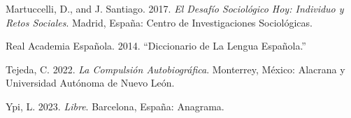 \documentclass[
]{interact}
\newlength{\cslhangindent}
\newenvironment{CSLReferences}[2] %
 {\begin{list}{}{%
  \setlength{\itemindent}{0pt}
  \setlength{\leftmargin}{0pt}
  \setlength{\parsep}{0pt}
  \ifodd #1
   \setlength{\leftmargin}{\cslhangindent}
   \setlength{\itemindent}{-1\cslhangindent}
  \fi
  \setlength{\itemsep}{#2\baselineskip}}}
 {\end{list}}
\begin{document}
\begin{CSLReferences}{1}{0}
Martuccelli, D., and J. Santiago. 2017. \emph{El Desaf{í}o Sociol{ó}gico
Hoy: Individuo y Retos Sociales}. Madrid, Espa{ñ}a: Centro de
Investigaciones Sociol{ó}gicas.

Real Academia Española. 2014. {``Diccionario de La Lengua Espa{ñ}ola.''}

Tejeda, C. 2022. \emph{La Compulsi{ó}n Autobiogr{á}fica}. Monterrey,
M{é}xico: Alacrana y Universidad Aut{ó}noma de Nuevo Le{ó}n.

Ypi, L. 2023. \emph{Libre}. Barcelona, Espa{ñ}a: Anagrama.

\end{CSLReferences}
\end{document}
